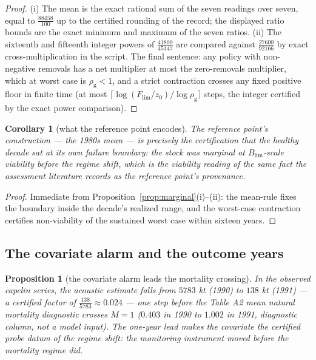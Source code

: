 \documentclass[10pt,twocolumn]{article}
\theoremstyle{plain}
\newtheorem{proposition}[theorem]{Proposition}
\newtheorem{corollary}[theorem]{Corollary}
\theoremstyle{remark}
\begin{document}
\begin{proof}
(i) The mean is the exact rational sum of the seven readings over
seven, equal to \(\tfrac{88458}{100}\) up to the certified rounding of
the record; the displayed ratio bounds are the exact minimum and
maximum of the seven ratios. (ii) The sixteenth and fifteenth integer
powers of \(\tfrac{41800}{45147}\) are compared against
\(\tfrac{27600}{92166}\) by exact cross-multiplication in the script.
The final sentence: any policy with non-negative removals has a net
multiplier at most the zero-removals multiplier, which at worst case is
\(\rho_{\mathrm{g}} < 1\), and a strict contraction crosses any fixed
positive floor in finite time (at most
\(\lceil \log(F_{\mathrm{lim}}/z_{0}) / \log \rho_{\mathrm{g}} \rceil\)
steps, the integer certified by the exact power comparison).
\end{proof}

\begin{corollary}[what the reference point encodes]\label{cor:lrp}
The reference point's construction --- the 1980s mean --- is precisely
the certification that the healthy decade sat at its own failure
boundary: the stock was marginal at \(B_{\mathrm{lim}}\)-scale
viability before the regime shift, which is the viability reading of
the same fact the assessment literature records as the reference
point's provenance.
\end{corollary}

\begin{proof}
Immediate from Proposition~\ref{prop:marginal}(i)--(ii): the mean-rule
fixes the boundary inside the decade's realized range, and the
worst-case contraction certifies non-viability of the sustained
worst case within sixteen years.
\end{proof}

\subsection{The covariate alarm and the outcome years}\label{probe}

\begin{proposition}[the covariate alarm leads the mortality
crossing]\label{prop:capelin}
In the observed capelin series, the acoustic estimate falls from
\(5783\) kt (1990) to \(138\) kt (1991) --- a certified factor of
\(\tfrac{138}{5783} \approx 0.024\) --- one step before the Table A2
mean natural mortality diagnostic crosses \(M = 1\) (\(0.403\) in
1990 to \(1.002\) in 1991, diagnostic column, not a model input). The
one-year lead makes the covariate the certified probe datum of the
regime shift: the monitoring instrument moved before the mortality
regime did.
\end{proposition}
\end{document}
